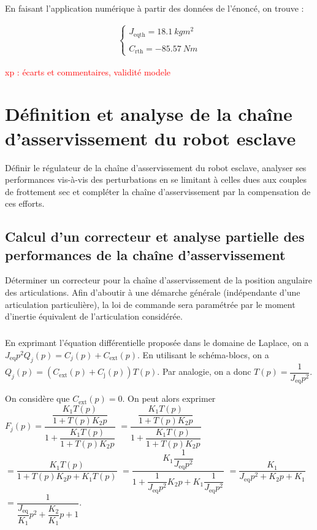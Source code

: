 \documentclass[10pt,fleqn]{article} %
\begin{document}
\subparagraph{}%

En faisant l'application numérique à partir des données de l'énoncé, on trouve : 

\begin{align*}
\left\{
\begin{array}{c}
J_{\text{eqth}}=\SI{18,1}{kg m^2}\\
\\
C_{\text{rth}}=-\SI{85,57}{N m}
\end{array}
\right.
\end{align*}

\textcolor{red}{xp : écarts et commentaires, validité modele}
\section{Définition et analyse de la chaîne d’asservissement du robot esclave}
\begin{obj}
Définir le régulateur de la chaîne d’asservissement du robot esclave, analyser ses performances vis-à-vis
des perturbations en se limitant à celles dues aux couples de frottement sec et compléter la chaîne
d’asservissement par la compensation de ces efforts.
\end{obj}

\subsection{Calcul d’un correcteur et analyse partielle des performances de la chaîne d’asservissement}
\begin{obj}
Déterminer un correcteur pour la chaîne d’asservissement de la position angulaire des articulations.
Afin d’aboutir à une démarche générale (indépendante d’une articulation particulière), la loi de commande
sera paramétrée par le moment d’inertie équivalent de l’articulation considérée.
\end{obj}

\subparagraph{}%
En exprimant l'équation différentielle proposée dans le domaine de Laplace, on a 
$J_{\text{eq}} p^2{Q}_j(p)=C_j(p)+C_{\text{ext}}(p)$.
En utilisant le schéma-blocs, on a $Q_j(p)=\left(C_{\text{ext}}(p)+C_{\text{j}}(p)\right)T(p)$. 
Par analogie, on a donc $T(p)=\dfrac{1}{J_{\text{eq}}p^2}$.

On considère que $C_{\text{ext}}(p)=0$.  On peut alors exprimer 
$F_j(p)= \dfrac{\dfrac{K_1T(p)}{1+T(p)K_2 p} }{1+\dfrac{K_1T(p)}{1+T(p)K_2 p}}$
$= \dfrac{\dfrac{K_1T(p)}{1+T(p)K_2 p} }{1+\dfrac{K_1T(p)}{1+T(p)K_2 p}}$
$= \dfrac{K_1T(p) }{1+T(p)K_2 p+K_1T(p)}$
$= \dfrac{K_1\dfrac{1}{J_{\text{eq}}p^2}}{1+\dfrac{1}{J_{\text{eq}}p^2}K_2 p+K_1\dfrac{1}{J_{\text{eq}}p^2}}$
$= \dfrac{K_1}{J_{\text{eq}}p^2+K_2 p+K_1}$
$= \dfrac{1}{\dfrac{J_{\text{eq}}}{K_1}p^2+\dfrac{K_2}{K_1}p+1}$.
\end{document}

